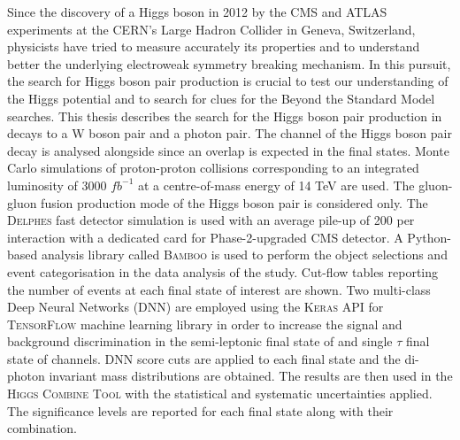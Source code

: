 Since the discovery of a Higgs boson in 2012 by the CMS and ATLAS experiments at the CERN's Large Hadron Collider in Geneva, Switzerland, physicists have tried to measure accurately its properties and to understand better the underlying electroweak symmetry breaking mechanism. In this pursuit, the search for Higgs boson pair production is crucial to test our understanding of the Higgs potential and to search for clues for the Beyond the Standard Model searches. This thesis describes the search for the Higgs boson pair production in decays to a W boson pair and a photon pair. The \ttgg channel of the Higgs boson pair decay is analysed alongside since an overlap is expected in the final states. Monte Carlo simulations of proton-proton collisions corresponding to an integrated luminosity of 3000 $fb^{-1}$ at a centre-of-mass energy of 14 TeV are used. The gluon-gluon fusion production mode of the Higgs boson pair is considered only. The \textsc{Delphes} fast detector simulation is used with an average pile-up of 200 per interaction with a dedicated card for Phase-2-upgraded CMS detector. A Python-based analysis library called \textsc{Bamboo} is used to perform the object selections and event categorisation in the data analysis of the study. Cut-flow tables reporting the number of events at each final state of interest are shown. Two multi-class Deep Neural Networks (DNN) are employed using the \textsc{Keras} API for \textsc{TensorFlow} machine learning library in order to increase the signal and background discrimination in the semi-leptonic final state of \wwgg and single $\tau$ final state of \ttgg channels. DNN score cuts are applied to each final state and the di-photon invariant mass distributions are obtained. The results are then used in the \textsc{Higgs Combine Tool} with the statistical and systematic uncertainties applied. The significance levels are reported for each final state along with their combination.